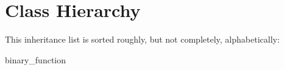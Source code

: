 \section{Class Hierarchy}
This inheritance list is sorted roughly, but not completely, alphabetically\-:\begin{DoxyCompactList}
\item binary\-\_\-function\begin{DoxyCompactList}
\item {}
\begin{DoxyCompactList}
\item {}
\item {}
\item {}
\end{DoxyCompactList}
\end{DoxyCompactList}
\item {}
\item {}
\end{DoxyCompactList}
